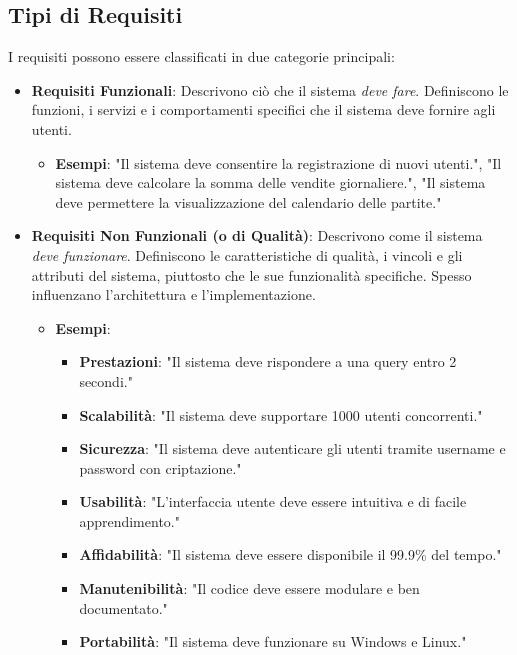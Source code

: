 \subsection{Tipi di Requisiti}
I requisiti possono essere classificati in due categorie principali:
\begin{itemize}
    \item \textbf{Requisiti Funzionali}: Descrivono ciò che il sistema \textit{deve fare}. Definiscono le funzioni, i servizi e i comportamenti specifici che il sistema deve fornire agli utenti.
    \begin{itemize}
        \item \textbf{Esempi}: "Il sistema deve consentire la registrazione di nuovi utenti.", "Il sistema deve calcolare la somma delle vendite giornaliere.", "Il sistema deve permettere la visualizzazione del calendario delle partite."
    \end{itemize}
    \item \textbf{Requisiti Non Funzionali (o di Qualità)}: Descrivono come il sistema \textit{deve funzionare}. Definiscono le caratteristiche di qualità, i vincoli e gli attributi del sistema, piuttosto che le sue funzionalità specifiche. Spesso influenzano l'architettura e l'implementazione.
    \begin{itemize}
        \item \textbf{Esempi}:
        \begin{itemize}
            \item \textbf{Prestazioni}: "Il sistema deve rispondere a una query entro 2 secondi."
            \item \textbf{Scalabilità}: "Il sistema deve supportare 1000 utenti concorrenti."
            \item \textbf{Sicurezza}: "Il sistema deve autenticare gli utenti tramite username e password con criptazione."
            \item \textbf{Usabilità}: "L'interfaccia utente deve essere intuitiva e di facile apprendimento."
            \item \textbf{Affidabilità}: "Il sistema deve essere disponibile il 99.9\% del tempo."
            \item \textbf{Manutenibilità}: "Il codice deve essere modulare e ben documentato."
            \item \textbf{Portabilità}: "Il sistema deve funzionare su Windows e Linux."
        \end{itemize}
    \end{itemize}
\end{itemize}

